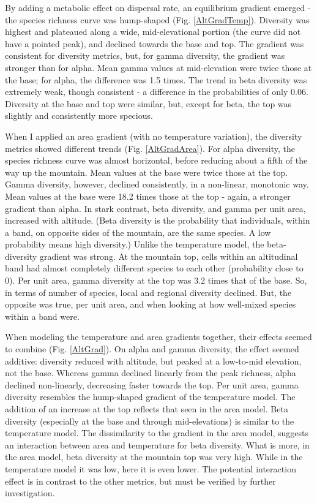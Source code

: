 \documentclass[11pt]{article}
\begin{document}
By adding a metabolic effect on dispersal rate, an equilibrium gradient emerged - the species richness curve was hump-shaped (Fig. \ref{AltGradTemp}). Diversity was highest and plateaued along a wide, mid-elevational portion (the curve did not have a pointed peak), and declined towards the base and top. The gradient was consistent for diversity metrics, but, for gamma diversity, the gradient was stronger than for alpha. Mean gamma values at mid-elevation were twice those at the base; for alpha, the difference was 1.5 times. The trend in beta diversity was extremely weak, though consistent - a difference in the probabilities of only 0.06. Diversity at the base and top were similar, but, except for beta, the top was slightly and consistently more specious.

When I applied an area gradient (with no temperature variation), the diversity metrics showed different trends (Fig. \ref{AltGradArea}). For alpha diversity, the species richness curve was almost horizontal, before reducing about a fifth of the way up the mountain. Mean values at the base were twice those at the top. Gamma diversity, however, declined consistently, in a non-linear, monotonic way. Mean values at the base were 18.2 times those at the top - again, a stronger gradient than alpha. In stark contrast, beta diversity, and gamma per unit area, increased with altitude.
%
(Beta diversity is the probability that individuals, within a band, on opposite sides of the mountain, are the same species. A low probability means high diversity.) Unlike the temperature model, the beta-diversity gradient was strong. At the mountain top, cells within an altitudinal band had almost completely different species to each other (probability close to 0). Per unit area, gamma diversity at the top was 3.2 times that of the base. So, in terms of number of species, local and regional diversity declined. But, the opposite was true, per unit area, and when looking at how well-mixed species within a band were.

When modeling the temperature and area gradients together, their effects seemed to combine (Fig. \ref{AltGrad}). On alpha and gamma diversity, the effect seemed additive: diversity reduced with altitude, but peaked at a low-to-mid elevation, not the base. Whereas gamma declined linearly from the peak richness, alpha declined non-linearly, decreasing faster towards the top. Per unit area, gamma diversity resembles the hump-shaped gradient of the temperature model. The addition of an increase at the top reflects that seen in the area model. Beta diversity (especially at the base and through mid-elevations) is similar to the temperature model. The dissimilarity to the gradient in the area model, suggests an interaction between area and temperature for beta diversity. What is more, in the area model, beta diversity at the mountain top was very high. While in the temperature model it was low, here it is even lower. The potential interaction effect is in contrast to the other metrics, but must be verified by further investigation.
\end{document}
